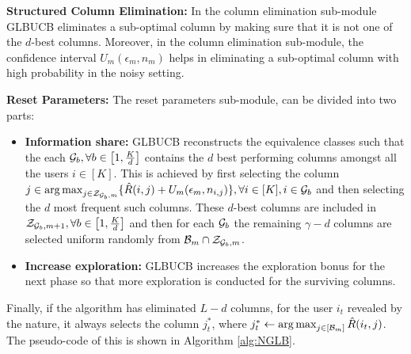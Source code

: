 \textbf{Structured Column Elimination:} In the column elimination sub-module GLBUCB eliminates a sub-optimal column by making sure that it is not one of the $d$-best columns. Moreover, in the column elimination sub-module, the confidence interval $U_m(\epsilon_m, n_m)$  helps in eliminating a sub-optimal column with high probability in the noisy setting. 

\textbf{Reset Parameters:} The reset parameters sub-module, can be divided into two parts: 
\begin{itemize}
\item\textbf{Information share:} GLBUCB reconstructs the equivalence classes such that the each $\mathcal{G}_b,\forall b\in\left[ 1, \frac{K}{d}\right]$ contains the $d$ best performing  columns amongst all the users $i\in[K]$. This is achieved by first selecting the  column $j\in \mathop{\rm arg\,max}_{j\in\mathcal{Z}_{\mathcal{G}_b,m}}\lbrace \hat{R}(i,j)  + U_m(\epsilon_m, n_{i,j})\rbrace, \forall i\in[K], i\in\mathcal{G}_b$ and then selecting the $d$ most frequent such columns. These $d$-best columns are included in $\mathcal{Z}_{\mathcal{G}_b,m+1}, \forall b\in\left[1,\frac{K}{d}\right]$ and then for each $\mathcal{G}_b$ the remaining $\gamma - d$ columns are selected uniform randomly from $\mathcal{B}_m \cap \mathcal{Z}_{\mathcal{G}_b,m}$.

\item\textbf{Increase exploration: } GLBUCB increases the exploration bonus for the next phase so that more exploration is conducted for the surviving columns. 

\end{itemize}

Finally, if the algorithm has eliminated $L-d$ columns, for the user $i_t$ revealed by the nature, it always selects the column $j^*_t$, where $j_t^* \leftarrow \mathop{\rm arg\,max}_{j\in[\mathcal{B}_m]} {\hat{R}(i_t,j)}$. The pseudo-code of this is shown in Algorithm \ref{alg:NGLB}. 




%

